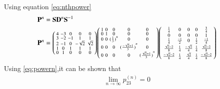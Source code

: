 \documentclass[journal,12pt,twocolumn]{IEEEtran}
\begin{document}
Using equation \eqref{eq:nthpower}
\begin{align}
	\mathbf{P}^n&=\mathbf{S}\mathbf{D}^n\mathbf{S}^{-1}\\
	\mathbf{P}^n&=\begin{psmallmatrix}
		4 & -3 & 0 & 0 & 0 \\
		3 & -2 & -1 & 1 & 1 \\
		2 & -1 & 0 & -\sqrt{2} & \sqrt{2} \\
		1 & 0 & 1 & 1 & 1 \\
		0 & 1 & 0 & 0 & 0
	\end{psmallmatrix}\begin{psmallmatrix}
	1 & 0 & 0 & 0 & 0 \\
	0 & 1 & 0 & 0 & 0 \\
	0 & 0 & {(\frac{1}{3})}^n & 0 & 0 \\
	0 & 0 & 0 & {(\frac{-\sqrt{2}+1}{3})}^n & 0 \\
	0 & 0 & 0 & 0 & {(\frac{\sqrt{2}+1}{3})}^n
\end{psmallmatrix}\begin{psmallmatrix}
\frac{1}{4} & 0 & 0 & 0 & \frac{3}{4} \\
0 & 0 & 0 & 0 & 1 \\
\frac{1}{4} & \frac{-1}{2} & 0 & \frac{1}{2} & \frac{-1}{4} \\
\frac{\sqrt{2}-2}{8} & \frac{1}{4} & \frac{-\sqrt{2}}{4} & \frac{1}{4} & \frac{\sqrt{2}-2}{8} \\
\frac{-\sqrt{2}-2}{8} & \frac{1}{4} & \frac{\sqrt{2}}{4} & \frac{1}{4} & \frac{-\sqrt{2}-2}{8}
\end{psmallmatrix}\label{eq:powern}	
\end{align}
Using \eqref{eq:powern},it can be shown that
\begin{align}
	\lim_{n \to \infty} p_{23}^{(n)}=0
\end{align}









	
\end{document}

